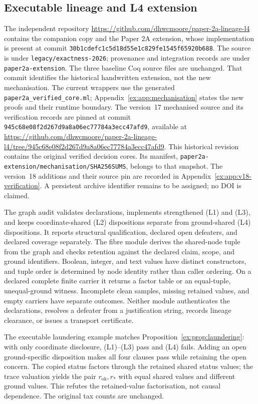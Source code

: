 \documentclass[11pt]{article}
\theoremstyle{definition}
\begin{document}
\subsection{Executable lineage and L4 extension}\label{ex:app:extension}
The independent repository \url{https://github.com/dhwcmoore/paper-2a-lineage-l4} contains the companion copy and the Paper 2A extension, whose implementation is present at commit \nolinkurl{30b1cdefc1c5d18d55e1c829fe1545f65920b688}. The source is under \nolinkurl{legacy/exactness-2026}; provenance and integration records are under \nolinkurl{paper2a-extension}. The three baseline Coq source files are unchanged. That commit identifies the historical handwritten extension, not the new mechanisation. The current wrappers use the generated \nolinkurl{paper2a_verified_core.ml}; Appendix~\ref{ex:app:mechanisation} states the new proofs and their runtime boundary. The version~17 mechanised source and its verification records are pinned at commit \nolinkurl{945c68e08f2d267d9a8a06ec77784a3ecc47afd9}, available at \url{https://github.com/dhwcmoore/paper-2a-lineage-l4/tree/945c68e08f2d267d9a8a06ec77784a3ecc47afd9}. This historical revision contains the original verified decision cores. Its manifest, \nolinkurl{paper2a-extension/mechanisation/SHA256SUMS}, belongs to that snapshot. The version~18 additions and their source pin are recorded in Appendix~\ref{ex:app:v18-verification}. A persistent archive identifier remains to be assigned; no DOI is claimed.

The graph audit validates declarations, implements strengthened (L1) and (L3), and keeps coordinate-shared (L2) dispositions separate from ground-shared (L4) dispositions. It reports structural qualification, declared open defeaters, and declared coverage separately. The fibre module derives the shared-node tuple from the graph and checks retention against the declared claim, scope, and ground identifiers. Boolean, integer, and text values have distinct constructors, and tuple order is determined by node identity rather than caller ordering. On a declared complete finite carrier it returns a factor table or an equal-tuple, unequal-ground witness. Incomplete clean samples, missing retained values, and empty carriers have separate outcomes. Neither module authenticates the declarations, resolves a defeater from a justification string, records lineage clearance, or issues a transport certificate.

The executable laundering example matches Proposition~\ref{ex:prop:laundering}: with only coordinate disclosure, (L1)--(L3) pass and (L4) fails. Adding an open ground-specific disposition makes all four clauses pass while retaining the open concern. The copied status factors through the retained shared status values; the trace valuation yields the pair $r_{\mathrm{ok}},r_*$ with equal shared values and different ground values. This refutes the retained-value factorisation, not causal dependence. The original tax counts are unchanged.
\end{document}
